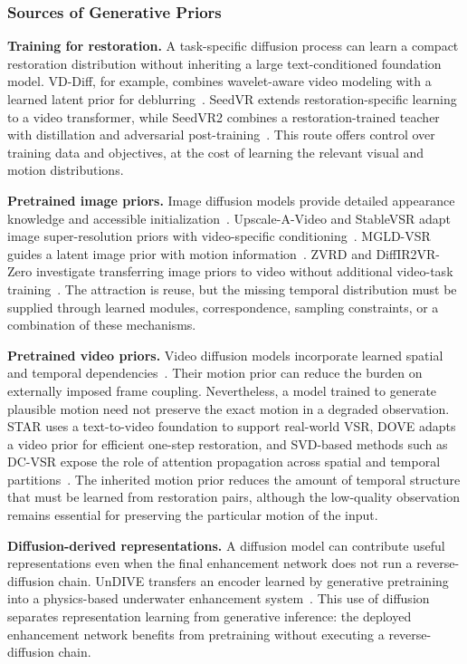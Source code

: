 \subsubsection{Sources of Generative Priors}
\textbf{Training for restoration.} A task-specific diffusion process can learn a compact restoration distribution without inheriting a large text-conditioned foundation model. VD-Diff, for example, combines wavelet-aware video modeling with a learned latent prior for deblurring~\cite{vddiff}. SeedVR extends restoration-specific learning to a video transformer, while SeedVR2 combines a restoration-trained teacher with distillation and adversarial post-training~\cite{seedvr,seedvr2}. This route offers control over training data and objectives, at the cost of learning the relevant visual and motion distributions.

\textbf{Pretrained image priors.} Image diffusion models provide detailed appearance knowledge and accessible initialization~\cite{ldm}. Upscale-A-Video and StableVSR adapt image super-resolution priors with video-specific conditioning~\cite{upscale,stablevsr}. MGLD-VSR guides a latent image prior with motion information~\cite{mgld}. ZVRD and DiffIR2VR-Zero investigate transferring image priors to video without additional video-task training~\cite{zvrd,diffir2vr}. The attraction is reuse, but the missing temporal distribution must be supplied through learned modules, correspondence, sampling constraints, or a combination of these mechanisms.

\textbf{Pretrained video priors.} Video diffusion models incorporate learned spatial and temporal dependencies~\cite{svd,wan}. Their motion prior can reduce the burden on externally imposed frame coupling. Nevertheless, a model trained to generate plausible motion need not preserve the exact motion in a degraded observation. STAR uses a text-to-video foundation to support real-world VSR, DOVE adapts a video prior for efficient one-step restoration, and SVD-based methods such as DC-VSR expose the role of attention propagation across spatial and temporal partitions~\cite{star,dove,dcvsr}. The inherited motion prior reduces the amount of temporal structure that must be learned from restoration pairs, although the low-quality observation remains essential for preserving the particular motion of the input.

\textbf{Diffusion-derived representations.} A diffusion model can contribute useful representations even when the final enhancement network does not run a reverse-diffusion chain. UnDIVE transfers an encoder learned by generative pretraining into a physics-based underwater enhancement system~\cite{undive}. This use of diffusion separates representation learning from generative inference: the deployed enhancement network benefits from pretraining without executing a reverse-diffusion chain.

